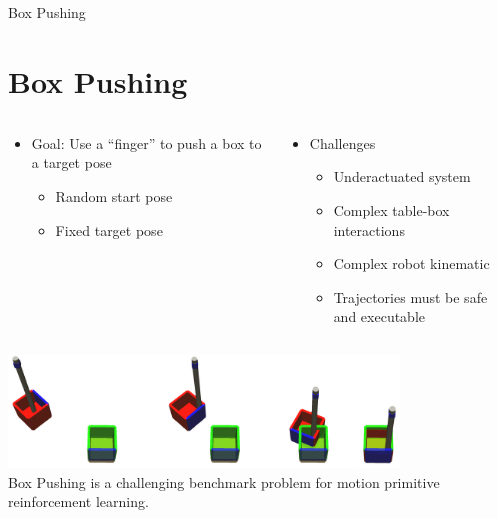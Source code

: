 \documentclass[16:9,en,navbarinfooter]{sdqbeamer}
\begin{document}
\begin{frame}{Box Pushing}
\section{Box Pushing}

\begin{columns}[t]
    \begin{column}{0.5\textwidth}
        \begin{itemize}
            \item Goal: Use a ``finger'' to push a box to a target pose
                \begin{itemize}
                    \item Random start pose
                    \item Fixed target pose
                \end{itemize}
        \end{itemize}
    \end{column}
    \begin{column}{0.5\textwidth}
        \begin{itemize}
                \item Challenges
                    \begin{itemize}
                            \item Underactuated system
                            \item Complex table-box interactions
                            \item Complex robot kinematic 
                            \item Trajectories must be safe and executable
                    \end{itemize}
        \end{itemize}
    \end{column}


\end{columns}
\center
    \includegraphics[height=3cm]{media/2dboxpushing.png}
    \vspace{.1cm}\\
    Box Pushing is a challenging benchmark problem for motion primitive reinforcement learning.
\end{frame}
\end{document}
